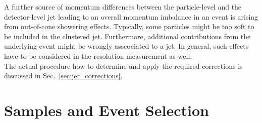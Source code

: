 A further source of momentum differences between the particle-level and the detector-level jet leading to an overall momentum imbalance in an event is arising from out-of-cone showering effects. Typically, some particles might be too soft to be included in the clustered jet. Furthermore, additional contributions from the underlying event might be wrongly asscociated to a jet. In general, such effects have to be considered in the resolution measurement as well. \\
The actual procedure how to determine and apply the required corrections is discussed in Sec.~\ref{sec:jer_corrections}.

\section{Samples and Event Selection}
\label{sec:jer_selection}


